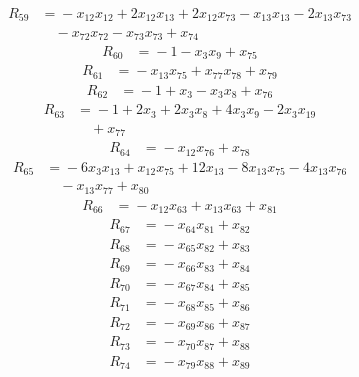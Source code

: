\begin{align*}
R_{59}&={}-x_{12}x_{12} +2x_{12}x_{13} +2x_{12}x_{73} -x_{13}x_{13} -2x_{13}x_{73}\\
&\quad{}-x_{72}x_{72} -x_{73}x_{73} +x_{74}
\end{align*}
\begin{align*}
R_{60}&={}-1 -x_{3}x_{9} +x_{75}
\end{align*}
\begin{align*}
R_{61}&={}-x_{13}x_{75} +x_{77}x_{78} +x_{79}
\end{align*}
\begin{align*}
R_{62}&={}-1 +x_{3} -x_{3}x_{8} +x_{76}
\end{align*}
\begin{align*}
R_{63}&={}-1 +2x_{3} +2x_{3}x_{8} +4x_{3}x_{9} -2x_{3}x_{19}\\
&\quad{}+x_{77}
\end{align*}
\begin{align*}
R_{64}&={}-x_{12}x_{76} +x_{78}
\end{align*}
\begin{align*}
R_{65}&={}-6x_{3}x_{13} +x_{12}x_{75} +12x_{13} -8x_{13}x_{75} -4x_{13}x_{76}\\
&\quad{}-x_{13}x_{77} +x_{80}
\end{align*}
\begin{align*}
R_{66}&={}-x_{12}x_{63} +x_{13}x_{63} +x_{81}
\end{align*}
\begin{align*}
R_{67}&={}-x_{64}x_{81} +x_{82}
\end{align*}
\begin{align*}
R_{68}&={}-x_{65}x_{82} +x_{83}
\end{align*}
\begin{align*}
R_{69}&={}-x_{66}x_{83} +x_{84}
\end{align*}
\begin{align*}
R_{70}&={}-x_{67}x_{84} +x_{85}
\end{align*}
\begin{align*}
R_{71}&={}-x_{68}x_{85} +x_{86}
\end{align*}
\begin{align*}
R_{72}&={}-x_{69}x_{86} +x_{87}
\end{align*}
\begin{align*}
R_{73}&={}-x_{70}x_{87} +x_{88}
\end{align*}
\begin{align*}
R_{74}&={}-x_{79}x_{88} +x_{89}
\end{align*}
